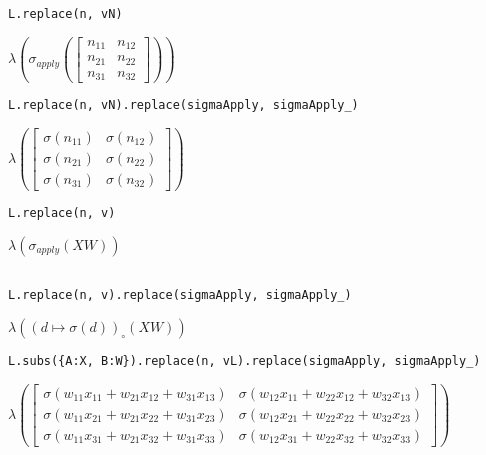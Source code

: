 \documentclass[
]{article}
\begin{document}
\begin{verbatim}
L.replace(n, vN)
\end{verbatim}

\(\displaystyle \lambda{\left(\sigma_{apply}{\left(\left[\begin{matrix}n_{11} & n_{12}\\n_{21} & n_{22}\\n_{31} & n_{32}\end{matrix}\right] \right)} \right)}\)

\begin{verbatim}
L.replace(n, vN).replace(sigmaApply, sigmaApply_)
\end{verbatim}

\(\displaystyle \lambda{\left(\left[\begin{matrix}\sigma{\left(n_{11} \right)} & \sigma{\left(n_{12} \right)}\\\sigma{\left(n_{21} \right)} & \sigma{\left(n_{22} \right)}\\\sigma{\left(n_{31} \right)} & \sigma{\left(n_{32} \right)}\end{matrix}\right] \right)}\)

\begin{verbatim}
L.replace(n, v)
\end{verbatim}

\(\displaystyle \lambda{\left(\sigma_{apply}{\left(X W \right)} \right)}\)

\begin{verbatim}

L.replace(n, v).replace(sigmaApply, sigmaApply_)
\end{verbatim}

\(\displaystyle \lambda{\left({\left( d \mapsto \sigma{\left(d \right)} \right)}_{\circ}\left({X W}\right) \right)}\)

\begin{verbatim}
L.subs({A:X, B:W}).replace(n, vL).replace(sigmaApply, sigmaApply_)
\end{verbatim}

\(\displaystyle \lambda{\left(\left[\begin{matrix}\sigma{\left(w_{11} x_{11} + w_{21} x_{12} + w_{31} x_{13} \right)} & \sigma{\left(w_{12} x_{11} + w_{22} x_{12} + w_{32} x_{13} \right)}\\\sigma{\left(w_{11} x_{21} + w_{21} x_{22} + w_{31} x_{23} \right)} & \sigma{\left(w_{12} x_{21} + w_{22} x_{22} + w_{32} x_{23} \right)}\\\sigma{\left(w_{11} x_{31} + w_{21} x_{32} + w_{31} x_{33} \right)} & \sigma{\left(w_{12} x_{31} + w_{22} x_{32} + w_{32} x_{33} \right)}\end{matrix}\right] \right)}\)
\end{document}
